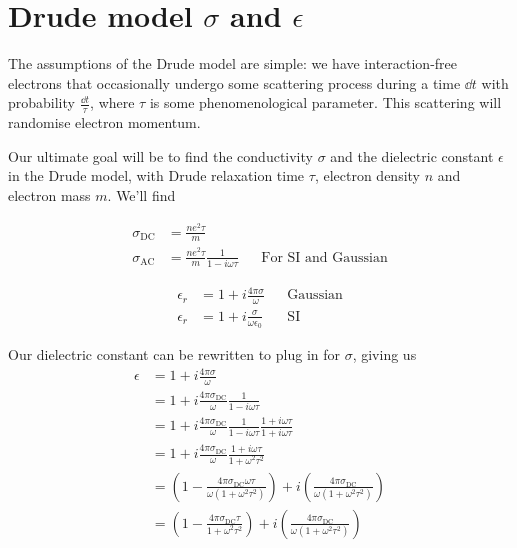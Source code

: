 \documentclass[../../main.tex]{subfiles}
\newcommand{\sigmaDC}{\sigma_{\textrm{DC}}}
\newcommand{\sigmaAC}{\sigma_{\textrm{AC}}}
\begin{document}
\section{Drude model $\sigma$ and $\epsilon$}

The assumptions of the Drude model are simple: we have interaction-free electrons that occasionally undergo some scattering process during a time $\dd{t}$ with probability $\frac{\dd{t}}{\tau}$, where $\tau$ is some phenomenological parameter. This scattering will randomise electron momentum.

Our ultimate goal will be to find the conductivity $\sigma$ and the dielectric constant $\epsilon$ in the Drude model, with Drude relaxation time $\tau$, electron density $n$ and electron mass $m$. We'll find

\begin{align}
	\sigmaDC &= \frac{n e^2 \tau}{m} \\
	\sigmaAC &= \frac{n e^2 \tau}{m} \frac{1}{1 - i \omega \tau} && \text{For SI and Gaussian}
\end{align}

\begin{subequations}
	\begin{align}
		\epsilon_r &= 1 + i \frac{4 \pi \sigma}{\omega} && \text{Gaussian} \\
		\epsilon_r &= 1 + i \frac{\sigma}{\omega \epsilon_0} && \text{SI} 
	\end{align}
\end{subequations}

Our dielectric constant can be rewritten to plug in for $\sigma$, giving us
\begin{align}
	\epsilon &= 1 + i \frac{4 \pi \sigma}{\omega} \\
	&= 1 + i \frac{4 \pi \sigmaDC}{\omega} \frac{1}{1 - i \omega \tau} \\
 &= 1 + i \frac{4 \pi \sigmaDC}{\omega} \frac{1}{1 - i \omega \tau} \frac{1 + i \omega\tau}{1 + i \omega \tau} \\
 &= 1 + i \frac{4 \pi \sigmaDC}{\omega} \frac{1 + i \omega \tau}{1 + \omega^2 \tau^2} \\
 &= \left(1 - \frac{4 \pi \sigmaDC \omega \tau}{\omega\left(1 + \omega^2 \tau^2 \right)} \right) + i \left( \frac{4 \pi \sigmaDC}{\omega \left( 1 + \omega^2 \tau^2 \right)} \right) \\
 &= \left(1 - \frac{4 \pi \sigmaDC  \tau}{1 + \omega^2 \tau^2 } \right) + i \left( \frac{4 \pi \sigmaDC}{\omega \left( 1 + \omega^2 \tau^2 \right)} \right) 
\end{align}
\end{document}
